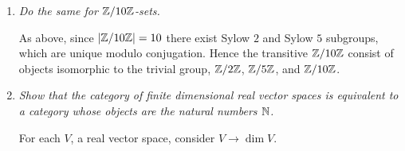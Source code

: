 \documentclass[10pt]{article}
\begin{document}
\begin{enumerate}
\begin{enumerate}
\item \emph{Do the same for $\mathbb{Z}/10\mathbb{Z}$-sets.}

As above, since $\left| \mathbb{Z}/10\mathbb{Z} \right| = 10$ there exist Sylow $2$ and Sylow $5$ subgroups, which are unique modulo conjugation.  Hence the transitive $\mathbb{Z}/10\mathbb{Z}$ consist of objects isomorphic to the trivial group, $\mathbb{Z}/2\mathbb{Z}$, $\mathbb{Z}/5\mathbb{Z}$, and $\mathbb{Z}/10\mathbb{Z}$.

\item \emph{Show that the category of finite dimensional real vector spaces is equivalent to a category whose objects are the natural numbers $\mathbb{N}$.}

For each $V$, a real vector space, consider $V \rightarrow \dim V$.
\end{enumerate}
\end{enumerate}
\end{document}
